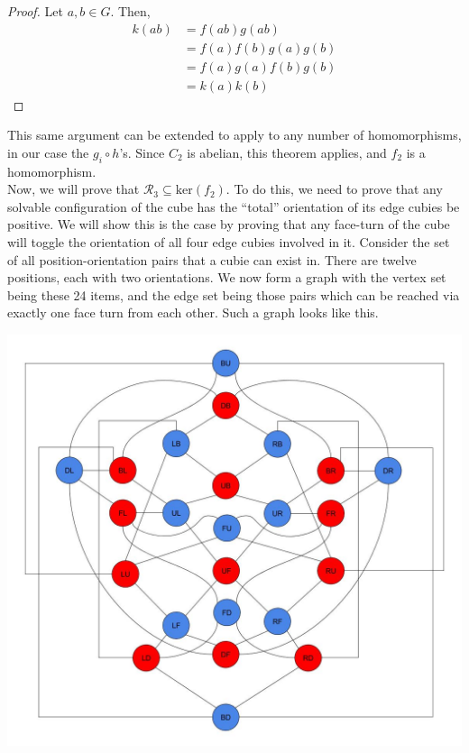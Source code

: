 \documentclass[10pt,letterpaper]{report}
\begin{document}
\begin{proof}
Let $a,b \in G$.  Then,
\begin{align*}
k(ab) &= f(ab)g(ab) \\
&= f(a)f(b)g(a)g(b) \\
&= f(a)g(a)f(b)g(b) \\
&= k(a)k(b)
\end{align*}
\end{proof}

This same argument can be extended to apply to any number of homomorphisms, in our case the $g_i \circ h$'s.  Since $C_2$ is abelian, this theorem applies, and $f_2$ is a homomorphism. \\

Now, we will prove that $\mathcal{R}_3 \subseteq \text{ker}(f_2)$.  To do this, we need to prove that any solvable configuration of the cube has the ``total'' orientation of its edge cubies be positive.  We will show this is the case by proving that any face-turn of the cube will toggle the orientation of all four edge cubies involved in it.  Consider the set of all position-orientation pairs that a cubie can exist in.  There are twelve positions, each with two orientations.  We now form a graph with the vertex set being these 24 items, and the edge set being those pairs which can be reached via exactly one face turn from each other.  Such a graph looks like this.

\begin{center}
\includegraphics[scale=.35]{images/Rubiks_Edge_Graph.jpg} 
\end{center}
\end{document}
